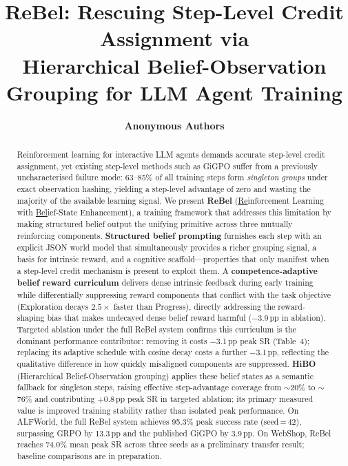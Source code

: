 \documentclass{article}
\title{ReBel: Rescuing Step-Level Credit Assignment via \\
  Hierarchical Belief-Observation Grouping for LLM Agent Training}
\author{%
  \textbf{Anonymous Authors}
}
\begin{document}
\maketitle

\begin{abstract}
Reinforcement learning for interactive LLM agents demands accurate step-level
credit assignment, yet existing step-level methods such as GiGPO suffer from a
previously uncharacterised failure mode: 63--85\% of all training steps form
\emph{singleton groups} under exact observation hashing, yielding a step-level
advantage of zero and wasting the majority of the available learning signal.
We present \textbf{ReBel} (\underline{Re}inforcement Learning with
\underline{Bel}ief-State Enhancement), a training framework that addresses this
limitation by making structured belief output the unifying primitive across
three mutually reinforcing components.
\textbf{Structured belief prompting} furnishes each step with an explicit JSON
world model that simultaneously provides a richer grouping signal, a basis for
intrinsic reward, and a cognitive scaffold---properties that only manifest
when a step-level credit mechanism is present to exploit them.
A \textbf{competence-adaptive belief reward curriculum} delivers dense intrinsic
feedback during early training while differentially suppressing reward components
that conflict with the task objective (Exploration decays $2.5\times$ faster
than Progress), directly addressing the reward-shaping bias that makes
undecayed dense belief reward harmful ($-$3.9\,pp in ablation).
Targeted ablation under the full ReBel system confirms this curriculum is the
dominant performance contributor: removing it costs $-$3.1\,pp peak SR
(Table~4); replacing its adaptive schedule with cosine decay costs
a further $-$3.1\,pp, reflecting the qualitative difference in how quickly
misaligned components are suppressed.
\textbf{HiBO} (Hierarchical Belief-Observation grouping) applies these belief
states as a semantic fallback for singleton steps, raising effective
step-advantage coverage from $\sim$20\% to $\sim$76\% and contributing
$+$0.8\,pp peak SR in targeted ablation; its primary measured value is
improved training stability rather than isolated peak performance.
On ALFWorld, the full ReBel system achieves 95.3\% peak success rate
(seed\,=\,42), surpassing GRPO by 13.3\,pp and the published GiGPO
by 3.9\,pp.
On WebShop, ReBel reaches 74.0\% mean peak SR across three seeds
as a preliminary transfer result; baseline comparisons are in preparation.
\end{abstract}
\end{document}
